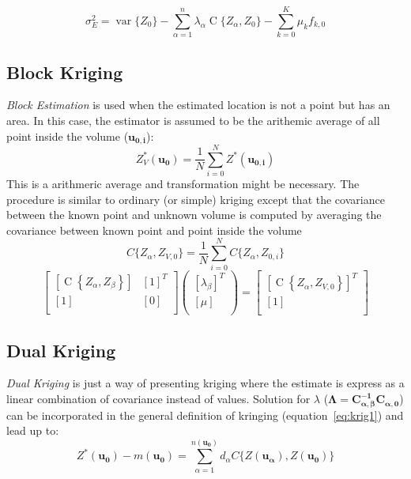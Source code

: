 \documentclass[twocolumn]{article}
\numberwithin{equation}{section}
\begin{document}
\begin{equation}
	\sigma_E^2 =  \operatorname{var}\{ Z_0\} - \sum_{\alpha=1}^n \lambda_\alpha \operatorname{C}\{Z_\alpha,Z_0\} - \sum_{k=0}^K \mu_k f_{k,0}
\end{equation}


\subsection{Block Kriging} 
\emph{Block Estimation} is used when the estimated location is not a point but has an area. In this case, the estimator is assumed to be the arithemic average of all point inside the volume ($\boldsymbol{u_{0,i}}$):
\[ Z_V^*( \boldsymbol{u_{0}}) = \frac{1}{N} \sum_{i=0}^N Z^*(\boldsymbol{u_{0,i}})\]
This is a arithmeric average and transformation might be necessary. The procedure is similar to ordinary (or simple) kriging except that the covariance between the known point and unknown volume is computed by averaging the covariance between known point and point inside the volume
\[ C\{Z_{\alpha},Z_{V,0}\}  = \frac{1}{N} \sum_{i=0}^N  C\{Z_{\alpha}, Z_{0,i}\} \]
\begin{equation}
		\begin{bmatrix}
       		[\operatorname{C}\left\{Z_\alpha,Z_\beta\right\}]	& [1]^T	\\
       		[1]							& [0	]						\\
     	\end{bmatrix} 
     	\begin{pmatrix}
       		[\lambda_\beta]^T 	\\
       		[\mu] 		\\
     	\end{pmatrix}
     	=
     	\begin{bmatrix}
       		[\operatorname{C}\left\{Z_\alpha,Z_{V,0}\right\}]^T 	\\
       		[1]					\\
     	\end{bmatrix}
\end{equation}


\subsection{Dual Kriging}
\emph{Dual Kriging} is just a way of presenting kriging where the estimate is express as a linear combination of covariance instead of values. Solution for $\lambda$  ($\boldsymbol{\Lambda} = \boldsymbol{C_{\alpha,\beta}^{-1}} \boldsymbol{C_{\alpha,0}} $) can be incorporated in the general definition of kringing (equation~\ref{eq:krig1}) and lead up to:
\begin{equation} \label{eq:dualkrig}
		Z^* (\boldsymbol{u_0}) -m(\boldsymbol{u_0}) =  \sum_{\alpha=1}^{n(\boldsymbol{u_0})} d_\alpha C\{Z(\boldsymbol{u_\alpha}),Z(\boldsymbol{u_0})  \}
\end{equation}
\end{document}
